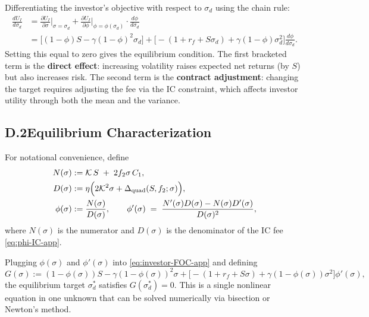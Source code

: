 Differentiating the investor's objective with respect to $\sigma_d$ using the chain rule:
\begin{align}
\frac{d U_I}{d \sigma_d} &= \frac{\partial U_I}{\partial \sigma}\Big|_{\sigma=\sigma_d} + \frac{\partial U_I}{\partial \phi}\Big|_{\phi=\phi(\sigma_d)} \cdot \frac{d\phi}{d\sigma_d} \nonumber\\
&= \Big[(1-\phi)S - \gamma(1-\phi)^2\sigma_d\Big] + \Big[-(1+r_f+S\sigma_d) + \gamma(1-\phi)\sigma_d^2\Big]\frac{d\phi}{d\sigma_d}.\label{eq:investor-FOC-app}
\end{align}
Setting this equal to zero gives the equilibrium condition. The first bracketed term is the \textbf{direct effect}: increasing volatility raises expected net returns (by $S$) but also increases risk. The second term is the \textbf{contract adjustment}: changing the target requires adjusting the fee via the IC constraint, which affects investor utility through both the mean and the variance.

\subsection*{D.2\quad Equilibrium Characterization}
For notational convenience, define
\begin{align}
N(\sigma) &:= \mathcal{K}\,S \;+\; 2 f_2 \sigma\,C_1, \\
D(\sigma) &:= \eta\Big(2 \mathcal{K}^2 \sigma + \Delta_{\text{quad}}(S,f_2;\sigma)\Big), \\
\phi(\sigma) &:= \frac{N(\sigma)}{D(\sigma)},\qquad
\phi'(\sigma) \;=\; \frac{N'(\sigma)D(\sigma) - N(\sigma)D'(\sigma)}{D(\sigma)^2},
\end{align}
where $N(\sigma)$ is the numerator and $D(\sigma)$ is the denominator of the IC fee \eqref{eq:phi-IC-app}.

Plugging $\phi(\sigma)$ and $\phi'(\sigma)$ into \eqref{eq:investor-FOC-app} and defining
\begin{equation}
G(\sigma) := (1-\phi(\sigma))S - \gamma(1-\phi(\sigma))^2\sigma + \Big[-(1+r_f+S\sigma) + \gamma(1-\phi(\sigma))\sigma^2\Big]\phi'(\sigma),
\end{equation}
the equilibrium target $\sigma_d^*$ satisfies $G(\sigma_d^*)=0$. This is a single nonlinear equation in one unknown that can be solved numerically via bisection or Newton's method.

